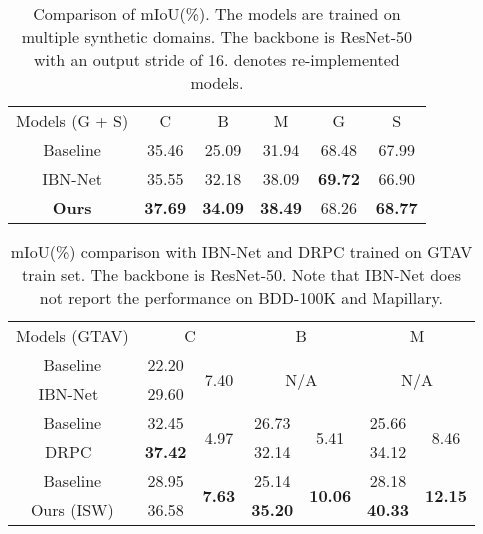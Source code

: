 \documentclass[final]{latex/cvpr}
\newcommand{\drule}{\specialrule{0.2pt}{1pt}{1pt}\specialrule{0.2pt}{0pt}{\belowrulesep}}
\begin{document}
\begin{table}[h]
\vspace*{-0.15cm}
\begin{center}
\footnotesize
\begin{tabular}{c|c|c|c||c|c}
\toprule
Models (G + S) & C & B & M & G & S \\
\drule
Baseline & 35.46 & 25.09 & 31.94 & 68.48 & 67.99 \\ 
\midrule
IBN-Net & 35.55 & 32.18 & 38.09 & \textbf{69.72} & 66.90 \\
\midrule
\textbf{Ours} & \textbf{37.69} & \textbf{34.09} & \textbf{38.49} & 68.26 & \textbf{68.77} \\
\bottomrule
\end{tabular}
\end{center}
\vspace*{-0.1cm}
\caption{Comparison of mIoU(\%). The models are trained on multiple synthetic domains. The backbone is ResNet-50 with an output stride of 16.  denotes re-implemented models.}
\label{tab_multi_source_best}
\vspace*{-0.5cm}
\end{table}




\begin{table}[b!]
\vspace*{-0.0cm}
\begin{center}
\setlength\tabcolsep{4.2pt}
\footnotesize
\begin{tabular}{c|cc|cc|cc}
\toprule
Models (GTAV) & \multicolumn{2}{c|}{C} & \multicolumn{2}{c|}{B} & \multicolumn{2}{c}{M} \\
\drule
Baseline & 22.20   & \multirow{2}{*}{7.40 } & \multicolumn{2}{c|}{\multirow{2}{*}{N/A}}  & \multicolumn{2}{c}{\multirow{2}{*}{N/A}} \\ 
IBN-Net~\cite{pan2018two} & 29.60   & & & &  & \\ 
\midrule
Baseline          & 32.45 & \multirow{2}{*}{4.97} & 26.73 & \multirow{2}{*}{5.41} & 25.66 & \multirow{2}{*}{8.46} \\ 
DRPC~\cite{yue2019domain} & \textbf{37.42} & & 32.14 &  & 34.12 &     \\ 
\midrule
Baseline & 28.95 & \multirow{2}{*}{\textbf{7.63}} & 25.14 & \multirow{2}{*}{\textbf{10.06}} & 28.18  & \multirow{2}{*}{\textbf{12.15}}  \\ 
Ours (ISW)   & 36.58 & & \textbf{35.20} &  & \textbf{40.33} & \\ 
\bottomrule
\end{tabular}
\end{center}
\vspace*{-0.15cm}
\caption{mIoU(\%) comparison with IBN-Net and DRPC trained on GTAV train set. The backbone is ResNet-50. Note that IBN-Net does not report the performance on BDD-100K and Mapillary.}
\label{tab_best_model_8}
\vspace*{-0.2cm}
\end{table}
\end{document}
